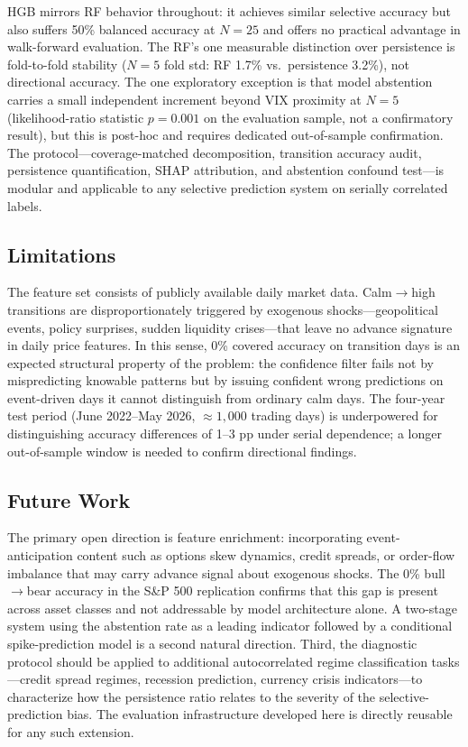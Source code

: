 \documentclass[12pt]{article}
\begin{document}
HGB mirrors RF behavior throughout: it achieves similar selective accuracy but also suffers 50\% balanced accuracy at $N = 25$ and offers no practical advantage in walk-forward evaluation. The RF's one measurable distinction over persistence is fold-to-fold stability ($N = 5$ fold std: RF 1.7\% vs.\ persistence 3.2\%), not directional accuracy. The one exploratory exception is that model abstention carries a small independent increment beyond VIX proximity at $N = 5$ (likelihood-ratio statistic $p = 0.001$ on the evaluation sample, not a confirmatory result), but this is post-hoc and requires dedicated out-of-sample confirmation. The protocol---coverage-matched decomposition, transition accuracy audit, persistence quantification, SHAP attribution, and abstention confound test---is modular and applicable to any selective prediction system on serially correlated labels.

\subsection*{Limitations}

The feature set consists of publicly available daily market data. Calm$\to$high transitions are disproportionately triggered by exogenous shocks---geopolitical events, policy surprises, sudden liquidity crises---that leave no advance signature in daily price features. In this sense, 0\% covered accuracy on transition days is an expected structural property of the problem: the confidence filter fails not by mispredicting knowable patterns but by issuing confident wrong predictions on event-driven days it cannot distinguish from ordinary calm days. The four-year test period (June 2022--May 2026, ${\approx}1{,}000$ trading days) is underpowered for distinguishing accuracy differences of 1--3 pp under serial dependence; a longer out-of-sample window is needed to confirm directional findings.

\subsection*{Future Work}

The primary open direction is feature enrichment: incorporating event-anticipation content such as options skew dynamics, credit spreads, or order-flow imbalance that may carry advance signal about exogenous shocks. The 0\% bull$\to$bear accuracy in the S\&P 500 replication confirms that this gap is present across asset classes and not addressable by model architecture alone. A two-stage system using the abstention rate as a leading indicator followed by a conditional spike-prediction model is a second natural direction. Third, the diagnostic protocol should be applied to additional autocorrelated regime classification tasks---credit spread regimes, recession prediction, currency crisis indicators---to characterize how the persistence ratio relates to the severity of the selective-prediction bias. The evaluation infrastructure developed here is directly reusable for any such extension.
\end{document}
